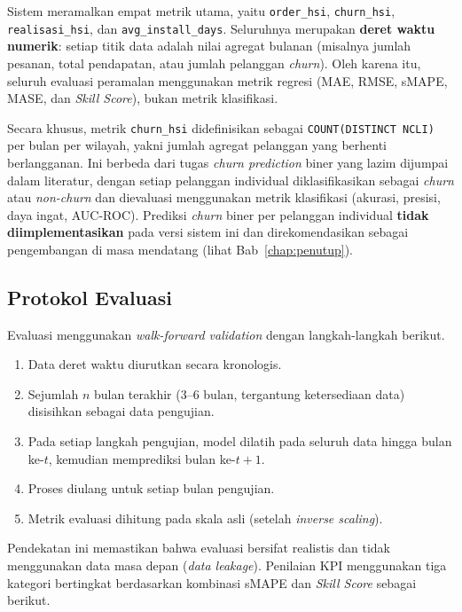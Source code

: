 Sistem meramalkan empat metrik utama, yaitu \texttt{order\_}\allowbreak\texttt{hsi}, \texttt{churn\_}\allowbreak\texttt{hsi}, \texttt{realisasi\_}\allowbreak\texttt{hsi}, dan \texttt{avg\_}\allowbreak\texttt{install\_}\allowbreak\texttt{days}. Seluruhnya merupakan \textbf{deret waktu numerik}: setiap titik data adalah nilai agregat bulanan (misalnya jumlah pesanan, total pendapatan, atau jumlah pelanggan \textit{churn}). Oleh karena itu, seluruh evaluasi peramalan menggunakan metrik regresi (MAE, RMSE, sMAPE, MASE, dan \textit{Skill Score}), bukan metrik klasifikasi.

Secara khusus, metrik \texttt{churn\_}\allowbreak\texttt{hsi} didefinisikan sebagai \texttt{COUNT(DISTINCT NCLI)} per bulan per wilayah, yakni jumlah agregat pelanggan yang berhenti berlangganan. Ini berbeda dari tugas \textit{churn prediction} biner yang lazim dijumpai dalam literatur, dengan setiap pelanggan individual diklasifikasikan sebagai \textit{churn} atau \textit{non-churn} dan dievaluasi menggunakan metrik klasifikasi (akurasi, presisi, daya ingat, AUC-ROC). Prediksi \textit{churn} biner per pelanggan individual \textbf{tidak diimplementasikan} pada versi sistem ini dan direkomendasikan sebagai pengembangan di masa mendatang (lihat Bab~\ref{chap:penutup}).

\subsection{Protokol Evaluasi}

Evaluasi menggunakan \textit{walk-forward va\-li\-da\-tion} dengan langkah-langkah berikut.

\begin{enumerate}
    \item Data deret waktu diurutkan secara kronologis.
    \item Sejumlah $n$ bulan terakhir (3--6 bulan, tergantung ketersediaan data) disisihkan sebagai data pengujian.
    \item Pada setiap langkah pengujian, model dilatih pada seluruh data hingga bulan ke-$t$, kemudian memprediksi bulan ke-$t+1$.
    \item Proses diulang untuk setiap bulan pengujian.
    \item Metrik evaluasi dihitung pada skala asli (setelah \textit{inverse scaling}).
\end{enumerate}

Pendekatan ini memastikan bahwa evaluasi bersifat realistis dan tidak menggunakan data masa depan (\textit{data leakage}). Penilaian KPI menggunakan tiga kategori bertingkat berdasarkan kombinasi sMAPE dan \textit{Skill Score} sebagai berikut.

